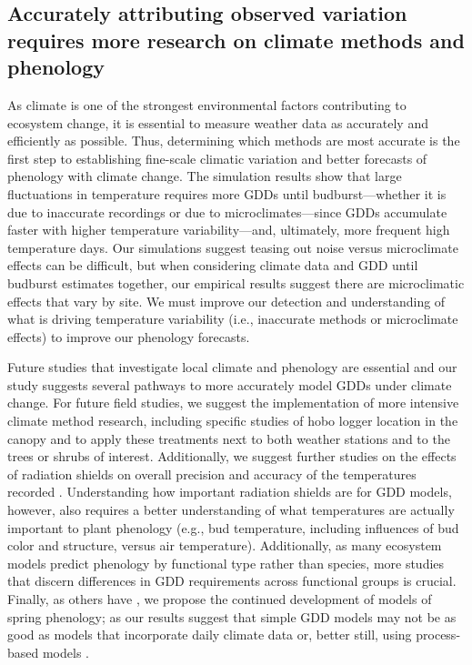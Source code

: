 \documentclass{article}\usepackage[]{graphicx}\usepackage[]{color}
\begin{document}
\subsection*{Accurately attributing observed variation requires more research on climate methods and phenology} 
As climate is one of the strongest environmental factors contributing to ecosystem change, it is essential to measure weather data as accurately and efficiently as possible. Thus, determining which methods are most accurate is the first step to establishing fine-scale climatic variation and better forecasts of phenology with climate change. The simulation results show that large fluctuations in temperature requires more GDDs until budburst---whether it is due to inaccurate recordings or due to microclimates---since GDDs accumulate faster with higher temperature variability---and, ultimately, more frequent high temperature days. Our simulations suggest teasing out noise versus microclimate effects can be difficult, but when considering climate data and GDD until budburst estimates together, our empirical results suggest there are microclimatic effects that vary by site. We must improve our detection and understanding of what is driving temperature variability (i.e., inaccurate methods or microclimate effects) to improve our phenology forecasts.
  
Future studies that investigate local climate and phenology are essential and our study suggests several pathways to more accurately model GDDs under climate change. For future field studies, we suggest the implementation of more intensive climate method research, including specific studies of hobo logger location in the canopy and to apply these treatments next to both weather stations and to the trees or shrubs of interest. Additionally, we suggest further studies on the effects of radiation shields on overall precision and accuracy of the temperatures recorded \citep{daCunha2015}. Understanding how important radiation shields are for GDD models, however, also requires a better understanding of what temperatures are actually important to plant phenology (e.g., bud temperature, including influences of bud color and structure, versus air temperature). Additionally, as many ecosystem models predict phenology by functional type rather than species, more studies that discern differences in GDD requirements across functional groups is crucial. Finally, as others have \citep{Duputie2015,Chuine2016}, we propose the continued development of models of spring phenology; as our results suggest that simple GDD models may not be as good as models that incorporate daily climate data or, better still, using process-based models \citep{Keenan2019}. 
 
\end{document}
